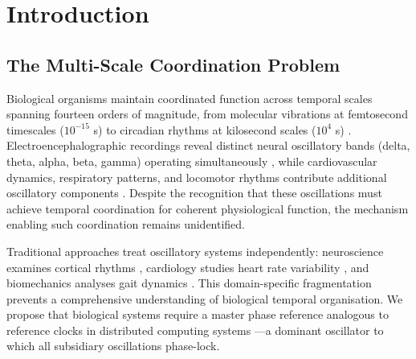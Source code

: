 \documentclass[12pt]{article}
\theoremstyle{remark}
\begin{document}
\begin{abstract}
Clinical applications include consciousness monitoring, oxygen-therapy optimization, process rate disease detection (Alzheimer's, Parkinson's, depression), performance enhancement through atmospheric coupling modulation, and anxiety treatment via oscillatory rate regulation. This work establishes the heart-oxygen-consciousness triad as the fundamental biological architecture, explaining why conscious experience emerged only after the Great Oxygenation Event and providing a measurable, therapeutically modifiable framework for understanding consciousness as oxygen-coupled variance minimisation in cardiac-referenced oscillatory networks.

\textbf{Keywords:} cardiac oscillations, atmospheric oxygen coupling, phase synchronisation, biological process rates, consciousness quantification, thermodynamic gas systems, oscillatory information density
\end{abstract}

\tableofcontents

\section{Introduction}

\subsection{The Multi-Scale Coordination Problem}

Biological organisms maintain coordinated function across temporal scales spanning fourteen orders of magnitude, from molecular vibrations at femtosecond timescales ($10^{-15}$ s) to circadian rhythms at kilosecond scales ($10^{4}$ s) \citep{glass2001synchronization,strogatz2003sync}. Electroencephalographic recordings reveal distinct neural oscillatory bands (delta, theta, alpha, beta, gamma) operating simultaneously \citep{buzsaki2006rhythms}, while cardiovascular dynamics, respiratory patterns, and locomotor rhythms contribute additional oscillatory components \citep{task1996heart}. Despite the recognition that these oscillations must achieve temporal coordination for coherent physiological function, the mechanism enabling such coordination remains unidentified.

Traditional approaches treat oscillatory systems independently: neuroscience examines cortical rhythms \citep{fries2005mechanism}, cardiology studies heart rate variability \citep{malik1996heart}, and biomechanics analyses gait dynamics \citep{hausdorff2007gait}. This domain-specific fragmentation prevents a comprehensive understanding of biological temporal organisation. We propose that biological systems require a master phase reference analogous to reference clocks in distributed computing systems \citep{lamport1978time}—a dominant oscillator to which all subsidiary oscillations phase-lock.
\end{document}

